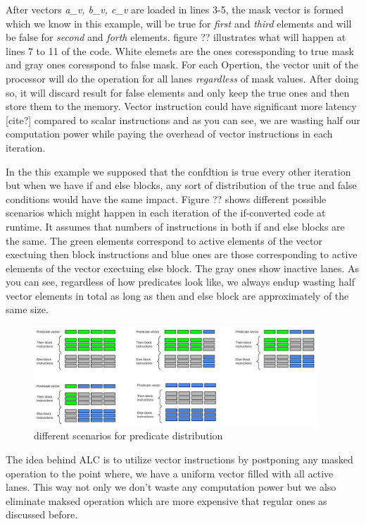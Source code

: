 \documentclass[\main/thesis.tex]{subfiles}
\begin{document}
After vectors \emph{a\_v, b\_v, c\_v} are loaded in lines 3-5, the mask vector is formed which we know in this example, will be true for \emph{first} and \emph{third} elements and will be false for \emph{second} and \emph{forth} elements. figure ?? illustrates what will happen at lines 7 to 11 of the code. White elemets are the ones coressponding to true mask and gray ones coresspond to false mask.
For each Opertion, the vector unit of the processor will do the operation for all lanes \emph{regardless} of mask values. After doing so, it will discard result for false elements and only keep the true ones and then store them to the memory. Vector instruction could have significant more latency [cite?] compared to scalar instructions and as you can see, we are wasting half our computation power while paying the overhead of vector instructions in each iteration.

In the this example we supposed that the confdtion is true every other iteration but when we have if and else blocks, any sort of distribution of the true and false conditions would have the same impact. Figure ?? shows different possible scenarios which might happen in each iteration of the if-converted code at runtime. It assumes that numbers of instructions in both if and else blocks are the same. The green elements correspond to active elements of the vector exectuing then block 
instructions and blue ones are those corresponding to active elements of the vector exectuing else block. The gray ones show inactive lanes. As you can see, regardless of how predicates look like, we always endup wasting half vector elements in total as long as then and else block are approximately of the same size. 

\begin{figure}[t!]
    \centering
    \includegraphics[width=0.95\textwidth]{img/condition_distribution.png}
    \caption{different scenarios for predicate distribution}
    \label{fig:predicate_distribution}
\end{figure}

The idea behind ALC is to utilize vector instructions by postponing any masked operation to the point where, we have a uniform vector filled with all active lanes. This way not only we don't waste any computation power but we also eliminate maksed operation which are more expensive that regular ones as discussed before.
\end{document}
